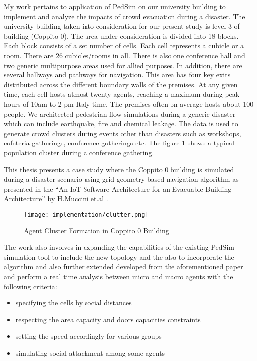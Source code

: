 My work pertains to application of PedSim on our university building to implement and analyze the impacts of crowd evacuation during a disaster. The university building taken into consideration for our present study is level 3 of building (Coppito 0). The area under consideration is divided into 18 blocks. Each block consists of a set number of cells. Each cell represents a cubicle or a room. There are 26 cubicles/rooms in all. There is also one conference hall and two generic multipurpose areas used for allied purposes. In addition, there are several hallways and pathways for navigation. This area has four key exits distributed across the different boundary walls of the premises. At any given time, each cell hosts atmost twenty agents, reaching a maximum during peak hours of 10am to 2 pm Italy time. The premises often on average hosts about 100 people. We architected pedestrian flow simulations during a generic disaster which can include earthquake, fire and chemical leakage. The data is used to generate crowd clusters during events other than disasters such as workshops, cafeteria gatherings, conference gatherings etc. The figure \ref{clutter} shows a typical population cluster during a conference gathering. 

This thesis presents a case study where the Coppito 0 building is simulated during a disaster scenario using grid geometry based navigation algorithm as presented in the “An IoT Software Architecture for an Evacuable Building Architecture” by H.Muccini et.al \cite{ref5}. 

\begin{figure}[H]
  \centering
  \texttt{[image: implementation/clutter.png]}
	\caption{Agent Cluster Formation in Coppito 0 Building}
  \label{clutter}
\end{figure}

The work also involves in expanding the capabilities of the existing PedSim simulation tool to include the new topology and the also to incorporate the algorithm and also further extended developed from the aforementioned paper and perform a real time analysis between micro and macro agents with the following criteria:

\begin{itemize}
  \item specifying the cells by social distances
  \item respecting the area capacity and doors capacities constraints
  \item setting the speed accordingly for various groups
  \item simulating social attachment among some agents 
\end{itemize}

